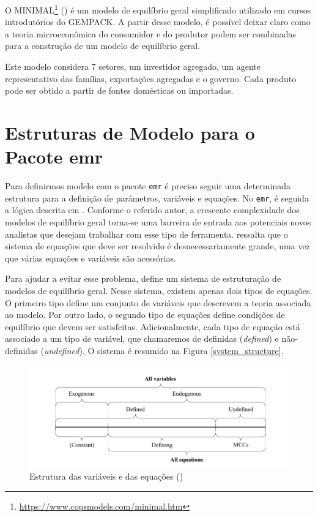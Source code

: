 \documentclass[12pt,twoside]{article}
\let\rmarkdownfootnote\footnote%
\def\footnote{\protect\rmarkdownfootnote}
\begin{document}
O MINIMAL\footnote{\url{https://www.copsmodels.com/minimal.htm}}
(\cite{horridge_2001}) é um modelo de equilíbrio geral simplificado
utilizado em cursos introdutórios do GEMPACK. A partir desse modelo, é
possível deixar claro como a teoria microeconômica do consumidor e do
produtor podem ser combinadas para a construção de um modelo de
equilíbrio geral.

Este modelo considera 7 setores, um investidor agregado, um agente
representativo das famílias, exportações agregadas e o governo. Cada
produto pode ser obtido a partir de fontes domésticas ou importadas.

\hypertarget{estruturas-de-modelo-para-o-pacote-emr}{%
\section{Estruturas de Modelo para o Pacote
emr}\label{estruturas-de-modelo-para-o-pacote-emr}}

Para definirmos modelo com o pacote \texttt{emr} é preciso seguir uma
determinada estrutura para a definição de parâmetros, variáveis e
equações. No \texttt{emr}, é seguida a lógica descrita em
\cite{zhang_2013}. Conforme o referido autor, a crescente complexidade
dos modelos de equilíbrio geral torna-se uma barreira de entrada aos
potenciais novos analistas que desejam trabalhar com esse tipo de
ferramenta. \cite{zhang_2013} ressalta que o sistema de equações que
deve ser resolvido é desnecessariamente grande, uma vez que várias
equações e variáveis são acessórias.

Para ajudar a evitar esse problema, \cite{zhang_2013} define um sistema
de estruturação de modelos de equilíbrio geral. Nesse sistema, existem
apenas dois tipos de equações. O primeiro tipo define um conjunto de
variáveis que descrevem a teoria associada ao modelo. Por outro lado, o
segundo tipo de equações define condições de equilíbrio que devem ser
satisfeitas. Adicionalmente, cada tipo de equação está associado a um
tipo de variável, que chamaremos de definidas (\emph{defined}) e
não-definidas (\emph{undefined}). O sistema é resumido na Figura
\ref{system_structure}.

\begin{figure}[H]

{\centering \includegraphics[width=5.73in]{structure_var_eq} 

}

\caption{Estrutura das variáveis e das equações (\cite{zhang_2013})\label{system_structure}}\label{fig:unnamed-chunk-1}
\end{figure}
\end{document}
